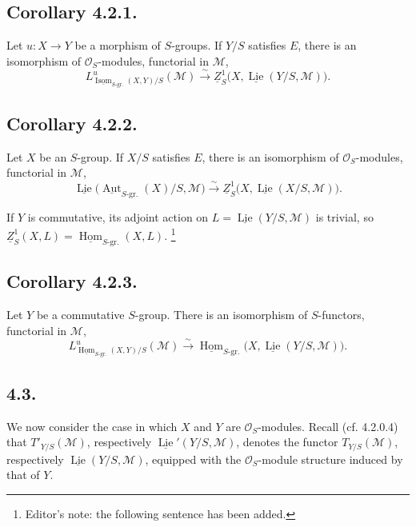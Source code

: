 \subsection*{Corollary 4.2.1.}
Let \(u:X\to Y\) be a morphism of \(S\)-groups. If \(Y/S\) satisfies
\(E\), there is an isomorphism of \(\mathcal O_S\)-modules, functorial in
\(\mathcal M\),
\[
 L^u_{\underline{\operatorname{Isom}}_{S\text{-gr.}}(X,Y)/S}
   (\mathcal M)
 \xrightarrow{\sim}
 \underline Z^1_S
   \bigl(X,\underline{\operatorname{Lie}}(Y/S,\mathcal M)\bigr).
\]

\subsection*{Corollary 4.2.2.}
Let \(X\) be an \(S\)-group. If \(X/S\) satisfies \(E\), there is an
isomorphism of \(\mathcal O_S\)-modules, functorial in \(\mathcal M\),
\[
 \underline{\operatorname{Lie}}
   \bigl(\underline{\operatorname{Aut}}_{S\text{-gr.}}(X)/S,
         \mathcal M\bigr)
 \xrightarrow{\sim}
 \underline Z^1_S
   \bigl(X,\underline{\operatorname{Lie}}(X/S,\mathcal M)\bigr).
\]

If \(Y\) is commutative, its adjoint action on
\(L=\underline{\operatorname{Lie}}(Y/S,\mathcal M)\) is trivial, so
\(\underline Z^1_S(X,L)=
\underline{\operatorname{Hom}}_{S\text{-gr.}}(X,L)\).
\footnote{Editor's note: the following sentence has been added.}

\subsection*{Corollary 4.2.3.}
Let \(Y\) be a commutative \(S\)-group. There is an isomorphism of
\(S\)-functors, functorial in \(\mathcal M\),
\[
 L^u_{\underline{\operatorname{Hom}}_{S\text{-gr.}}(X,Y)/S}
   (\mathcal M)
 \xrightarrow{\sim}
 \underline{\operatorname{Hom}}_{S\text{-gr.}}
   \bigl(X,\underline{\operatorname{Lie}}(Y/S,\mathcal M)\bigr).
\]

\subsection*{4.3.}
We now consider the case in which \(X\) and \(Y\) are
\(\mathcal O_S\)-modules. Recall (cf. 4.2.0.4) that
\(T'_{Y/S}(\mathcal M)\), respectively
\(\underline{\operatorname{Lie}}'(Y/S,\mathcal M)\), denotes the
functor \(T_{Y/S}(\mathcal M)\), respectively
\(\underline{\operatorname{Lie}}(Y/S,\mathcal M)\), equipped with the
\(\mathcal O_S\)-module structure induced by that of \(Y\).

